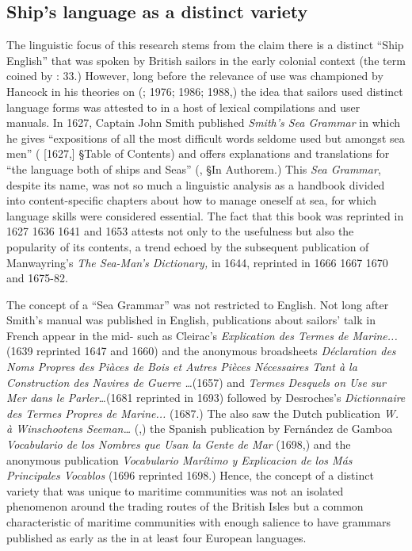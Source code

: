\subsection{{Ship’s language as a distinct variety}}\label{sec:1.1.2}



The linguistic focus of this research stems from the claim there is a distinct “Ship English” that was spoken by British sailors in the early colonial context (the term coined by \citealt{Hancock1976}: 33.) However, long before the relevance of  use was championed by Hancock in his theories on  (\citealt{Hancock1972}; 1976; 1986; 1988,) the idea that sailors used distinct language forms was attested to in a host of lexical compilations and user manuals. In {1627}, Captain John Smith published \textit{Smith’s Sea Grammar} in which he gives “expositions of all the most difficult words seldome used but amongst sea men” (\citealt{Smith1968} [1627,] §Table of Contents) and offers explanations and translations for “the language both of ships and Seas” (\citealt{Smith1968}, §In Authorem.) This \textit{Sea Grammar}, despite its name, was not so much a linguistic analysis as a handbook divided into content-specific chapters about how to manage oneself at sea, for which language skills were considered essential. The fact that this book was reprinted in 1627 1636 1641 and 1653 attests not only to the usefulness but also the popularity of its contents, a trend echoed by the subsequent publication of Manwayring’s \textit{The Sea-Man’s Dictionary,} in 1644, reprinted in 1666 1667 1670 and 1675-82. 



The concept of a “Sea Grammar” was not restricted to English. Not long after Smith’s manual was published in English, publications about sailors’ talk in French appear in the mid- such as Cleirac’s \textit{Explication des Termes de Marine...} (1639 reprinted 1647 and 1660) and the anonymous broadsheets \textit{Déclaration des Noms Propres des Piàces de Bois et Autres Pièces Nécessaires Tant à la Construction des Navires de Guerre …}(1657) and \textit{Termes Desquels on Use sur Mer dans le Parler…}(1681 reprinted in 1693) followed by Desroches’s \textit{Dictionnaire des Termes Propres de Marine...} (1687.) The  also saw the Dutch publication \textit{W. à Winschootens Seeman…} (\citealt{Winschooten1681},) the Spanish publication by Fernández de Gamboa \textit{Vocabulario de los Nombres que Usan la Gente de Mar} (1698,) and the anonymous publication \textit{Vocabulario Marítimo y Explicacion de los Más Principales Vocablos} (1696 reprinted 1698.) Hence, the concept of a distinct variety that was unique to maritime communities was not an isolated phenomenon around the trading routes of the British Isles but a common characteristic of maritime communities with enough salience to have grammars published as early as the  in at least four European languages. 



